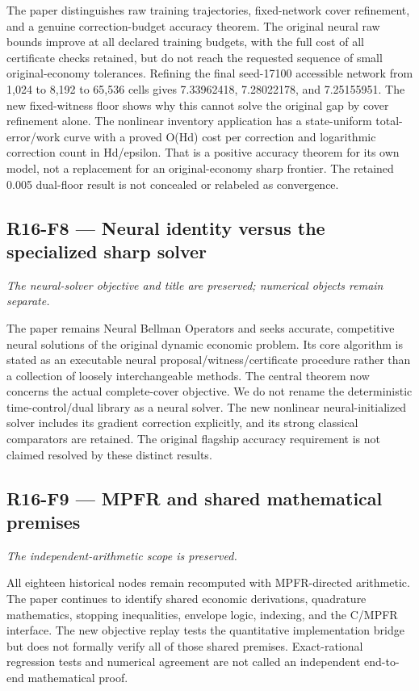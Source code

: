 \documentclass[ecta]{econsocart}
\theoremstyle{remark}
\begin{document}
The paper distinguishes raw training trajectories, fixed-network cover refinement, and a genuine correction-budget accuracy theorem. The original neural raw bounds improve at all declared training budgets, with the full cost of all certificate checks retained, but do not reach the requested sequence of small original-economy tolerances. Refining the final seed-17100 accessible network from 1,024 to 8,192 to 65,536 cells gives 7.33962418, 7.28022178, and 7.25155951. The new fixed-witness floor shows why this cannot solve the original gap by cover refinement alone. The nonlinear inventory application has a state-uniform total-error/work curve with a proved O(Hd) cost per correction and logarithmic correction count in Hd/epsilon. That is a positive accuracy theorem for its own model, not a replacement for an original-economy sharp frontier. The retained 0.005 dual-floor result is not concealed or relabeled as convergence.

\subsection{R16-F8 --- Neural identity versus the specialized sharp solver}
\noindent\emph{The neural-solver objective and title are preserved; numerical objects remain separate.}

The paper remains Neural Bellman Operators and seeks accurate, competitive neural solutions of the original dynamic economic problem. Its core algorithm is stated as an executable neural proposal/witness/certificate procedure rather than a collection of loosely interchangeable methods. The central theorem now concerns the actual complete-cover objective. We do not rename the deterministic time-control/dual library as a neural solver. The new nonlinear neural-initialized solver includes its gradient correction explicitly, and its strong classical comparators are retained. The original flagship accuracy requirement is not claimed resolved by these distinct results.

\subsection{R16-F9 --- MPFR and shared mathematical premises}
\noindent\emph{The independent-arithmetic scope is preserved.}

All eighteen historical nodes remain recomputed with MPFR-directed arithmetic. The paper continues to identify shared economic derivations, quadrature mathematics, stopping inequalities, envelope logic, indexing, and the C/MPFR interface. The new objective replay tests the quantitative implementation bridge but does not formally verify all of those shared premises. Exact-rational regression tests and numerical agreement are not called an independent end-to-end mathematical proof.
\end{document}
